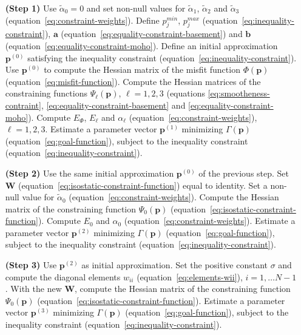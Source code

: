 \documentclass[manuscript]{geophysics}
\begin{document}
\begin{enumerate}
	\item [\textbf{(Step 1)}] Use $\tilde{\alpha}_{0} = 0$ and set non-null values for $\tilde{\alpha}_{1}$, $\tilde{\alpha}_{2}$ and $\tilde{\alpha}_{3}$ (equation~\ref{eq:constraint-weights}).
	Define $p_{j}^{min}$, $p_{j}^{max}$ (equation~\ref{eq:inequality-constraint}),
	$\mathbf{a}$ (equation~\ref{eq:equality-constraint-basement}) and
	$\mathbf{b}$ (equation~\ref{eq:equality-constraint-moho}).
	Define an initial approximation $\mathbf{p}^{(0)}$ satisfying the inequality constraint
	(equation~\ref{eq:inequality-constraint}). Use $\mathbf{p}^{(0)}$ to compute the 
	Hessian matrix of the misfit function $\Phi(\mathbf{p})$ (equation~\ref{eq:misfit-function}).
	Compute the Hessian matrices of the constraining functions $\Psi_{\ell}(\mathbf{p})$, 
	$\ell = 1, 2, 3$ (equations \ref{eq:smootheness-contraint},
	\ref{eq:equality-constraint-basement} and \ref{eq:equality-constraint-moho}). 
	Compute $E_{\Phi}$, $E_{\ell}$ and $\alpha_{\ell}$
	(equation~\ref{eq:constraint-weights}), $\ell = 1, 2, 3$. 
	Estimate a parameter vector $\mathbf{p}^{(1)}$
	minimizing $\Gamma(\mathbf{p})$ (equation~\ref{eq:goal-function}), 
	subject to the inequality constraint (equation~\ref{eq:inequality-constraint}).
	\item [\textbf{(Step 2)}] Use the same initial approximation $\mathbf{p}^{(0)}$
	of the previous step. Set $\mathbf{W}$ (equation~\ref{eq:isostatic-constraint-function})
	equal to identity. Set a non-null value for $\tilde{\alpha}_{0}$
	(equation~\ref{eq:constraint-weights}).
	Compute the Hessian matrix of the constraining function $\Psi_{0}(\mathbf{p})$
	(equation~\ref{eq:isostatic-constraint-function}).
	Compute $E_{0}$ and $\alpha_{0}$ (equation~\ref{eq:constraint-weights}).
	Estimate a parameter vector $\mathbf{p}^{(2)}$ minimizing $\Gamma(\mathbf{p})$ (equation~\ref{eq:goal-function}), subject to the inequality constraint 
	(equation~\ref{eq:inequality-constraint}).
	\item [\textbf{(Step 3)}] Use $\mathbf{p}^{(2)}$ as initial approximation.
	Set the positive constant $\sigma$ and compute the 
	diagonal elements $w_{ii}$ (equation~\ref{eq:elements-wii}), $i = 1, \dots N-1$.
	With the new $\mathbf{W}$, compute the Hessian matrix of the constraining function
	$\Psi_{0}(\mathbf{p})$ (equation~\ref{eq:isostatic-constraint-function}).
	Estimate a parameter vector $\mathbf{p}^{(3)}$ minimizing $\Gamma(\mathbf{p})$ (equation~\ref{eq:goal-function}), subject to the inequality constraint 
	(equation~\ref{eq:inequality-constraint}).
\end{enumerate}
\end{document}
